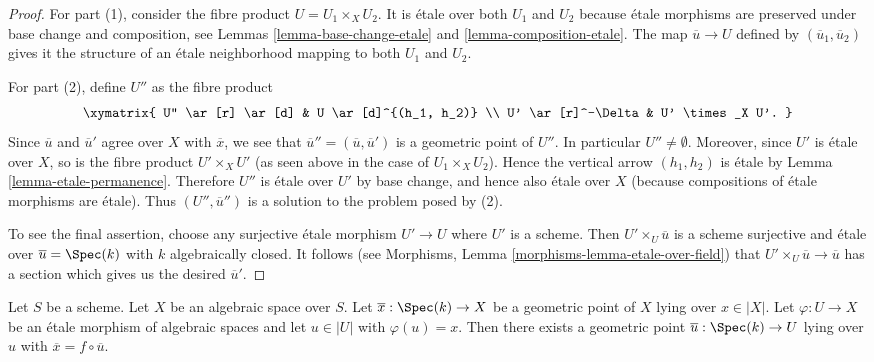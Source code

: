 \begin{proof}
For part (1), consider the fibre product $U = U_1 \times_X U_2$.
It is \'etale over both $U_1$ and $U_2$ because \'etale morphisms are
preserved under base change and composition, see
Lemmas \ref{lemma-base-change-etale} and \ref{lemma-composition-etale}.
The map $\overline{u} \to U$ defined by $(\overline{u}_1, \overline{u}_2)$
gives it the structure of an \'etale neighborhood mapping to both
$U_1$ and $U_2$.

\medskip\noindent
For part (2), define $U''$ as the fibre product
$$
\xymatrix{
U'' \ar[r] \ar[d] & U \ar[d]^{(h_1, h_2)} \\
U' \ar[r]^-\Delta & U' \times_X U'.
}
$$
Since $\overline{u}$ and $\overline{u}'$ agree over $X$ with $\overline{x}$,
we see that $\overline{u}'' = (\overline{u}, \overline{u}')$ is a geometric
point of $U''$. In particular $U'' \not = \emptyset$.
Moreover, since $U'$ is \'etale over $X$, so is the fibre product
$U'\times_X U'$ (as seen above in the case of $U_1 \times_X U_2$).
Hence the vertical arrow $(h_1, h_2)$ is \'etale by
Lemma \ref{lemma-etale-permanence}.
Therefore $U''$ is \'etale over $U'$ by base change, and hence also
\'etale over $X$ (because compositions of \'etale morphisms are \'etale).
Thus $(U'', \overline{u}'')$ is a solution to the problem posed by (2).

\medskip\noindent
To see the final assertion, choose any surjective \'etale morphism
$U' \to U$ where $U'$ is a scheme. Then
$U' \times_U \overline{u}$ is a scheme surjective and \'etale over
$\overline{u} = \Spec(k)$ with $k$ algebraically closed.
It follows (see
Morphisms, Lemma \ref{morphisms-lemma-etale-over-field})
that $U' \times_U \overline{u} \to \overline{u}$ has a section
which gives us the desired $\overline{u}'$.
\end{proof}

\begin{lemma}
\label{lemma-geometric-lift-to-usual}
Let $S$ be a scheme. Let $X$ be an algebraic space over $S$.
Let $\overline{x} : \Spec(k) \to X$ be a geometric point of $X$
lying over $x \in |X|$. Let $\varphi : U \to X$ be an \'etale morphism
of algebraic spaces and let $u \in |U|$ with $\varphi(u) = x$.
Then there exists a geometric point
$\overline{u} : \Spec(k) \to U$ lying over $u$ with
$\overline{x} = f \circ \overline{u}$.
\end{lemma}


